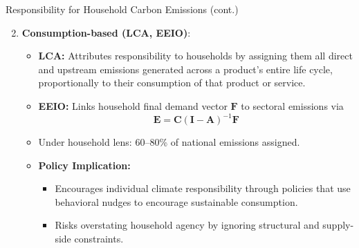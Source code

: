 \documentclass{beamer}
\begin{document}
\begin{frame}{Responsibility for Household Carbon Emissions (cont.)}
\footnotesize
\begin{enumerate}
  \setcounter{enumi}{1}
  \item \textbf{Consumption-based (LCA, EEIO)}: 
    \begin{itemize}
      \footnotesize

      \item \textbf{LCA:} Attributes responsibility to households by assigning them all direct and upstream emissions generated across a product’s entire life cycle, proportionally to their consumption of that product or service.
  \item \textbf{EEIO:} Links household final demand vector $\mathbf{F}$ to sectoral emissions via
    \[
      \mathbf{E} = \mathbf{C} (\mathbf{I} - \mathbf{A})^{-1} \mathbf{F}
    \]
      \item Under household lens: 60--80\% of national emissions assigned.
      \item \textbf{Policy Implication:} 
        \begin{itemize}
          \item Encourages individual climate responsibility through policies that use behavioral nudges to encourage sustainable consumption.
          \item Risks overstating household agency by ignoring structural and supply-side constraints.
        \end{itemize}
    \end{itemize}
    \end{enumerate}
    \end{frame}
\end{document}
